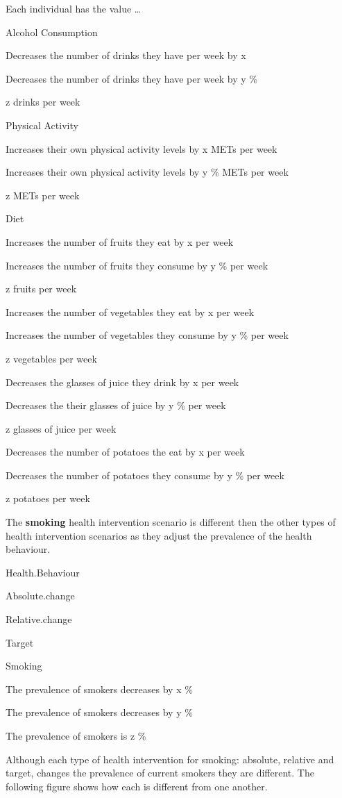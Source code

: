 \documentclass[]{book}
\begin{document}
Each individual has the value \ldots{}

Alcohol Consumption

Decreases the number of drinks they have per week by x

Decreases the number of drinks they have per week by y \%

z drinks per week

Physical Activity

Increases their own physical activity levels by x METs per week

Increases their own physical activity levels by y \% METs per week

z METs per week

Diet

Increases the number of fruits they eat by x per week

Increases the number of fruits they consume by y \% per week

z fruits per week

Increases the number of vegetables they eat by x per week

Increases the number of vegetables they consume by y \% per week

z vegetables per week

Decreases the glasses of juice they drink by x per week

Decreases the their glasses of juice by y \% per week

z glasses of juice per week

Decreases the number of potatoes the eat by x per week

Decreases the number of potatoes they consume by y \% per week

z potatoes per week

The \textbf{smoking} health intervention scenario is different then the
other types of health intervention scenarios as they adjust the
prevalence of the health behaviour.

Health.Behaviour

Absolute.change

Relative.change

Target

Smoking

The prevalence of smokers decreases by x \%

The prevalence of smokers decreases by y \%

The prevalence of smokers is z \%

Although each type of health intervention for smoking: absolute,
relative and target, changes the prevalence of current smokers they are
different. The following figure shows how each is different from one
another.
\end{document}

